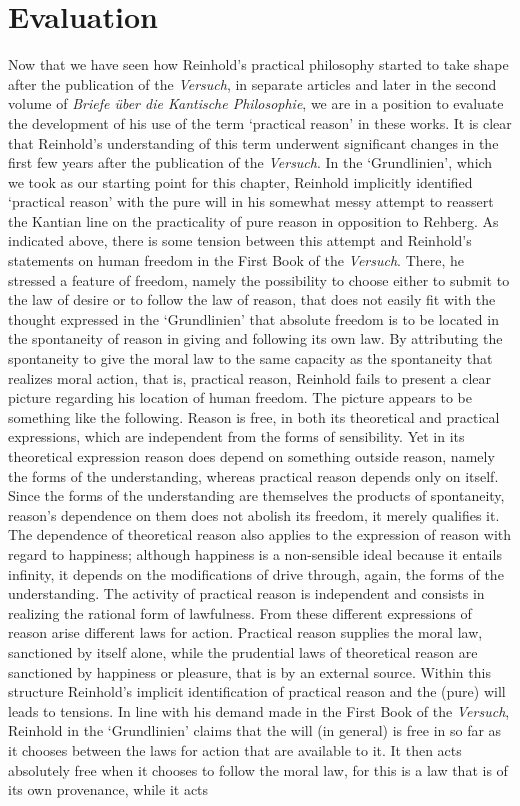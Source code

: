 \section{Evaluation}


Now that we have seen how Reinhold's practical philosophy started to take shape after the publication of the \textit{Versuch}, in separate articles and later in the second volume of \textit{Briefe \"{u}ber die Kantische Philosophie}, we are in a position to evaluate the development of his use of the term `practical reason' in these works. It is clear that Reinhold's understanding of this term underwent significant changes in the first few years after the publication of the \textit{Versuch}. In the `Grundlinien', which we took as our starting point for this chapter, Reinhold implicitly identified `practical reason' with the pure will in his somewhat messy attempt to reassert the Kantian line on the practicality of pure reason in opposition to Rehberg. As indicated above, there is some tension between this attempt and Reinhold's statements on human freedom in the First Book of the \textit{Versuch}. There, he stressed a feature of freedom, namely the possibility to choose either to submit to the law of desire or to follow the law of reason, that does not easily fit with the thought expressed in the `Grundlinien' that absolute freedom is to be located in the spontaneity of reason in giving and following its own law. By attributing the spontaneity to give the moral law to the same capacity as the spontaneity that realizes moral action, that is, practical reason, Reinhold fails to present a clear picture regarding his location of human freedom. The picture appears to be something like the following. Reason is free, in both its theoretical and practical expressions, which are independent from the forms of sensibility. Yet in its theoretical expression reason does depend on something outside reason, namely the forms of the understanding, whereas practical reason depends only on itself. Since the forms of the understanding are themselves the products of spontaneity, reason's dependence on them does not abolish its freedom, it merely qualifies it. The dependence of theoretical reason also applies to the expression of reason with regard to happiness; although happiness is a non{-}sensible ideal because it entails infinity, it depends on the modifications of drive through, again, the forms of the understanding. The activity of practical reason is independent and consists in realizing the rational form of lawfulness. From these different expressions of reason arise different laws for action. Practical reason supplies the moral law, sanctioned by itself alone, while the prudential laws of theoretical reason are sanctioned by happiness or pleasure, that is by an external source. Within this structure Reinhold's implicit identification of practical reason and the (pure) will leads to tensions. In line with his demand made in the First Book of the \textit{Versuch}, Reinhold in the `Grundlinien' claims that the will (in general) is free in so far as it chooses between the laws for action that are available to it. It then acts absolutely free when it chooses to follow the moral law, for this is a law that is of its own provenance, while it acts 